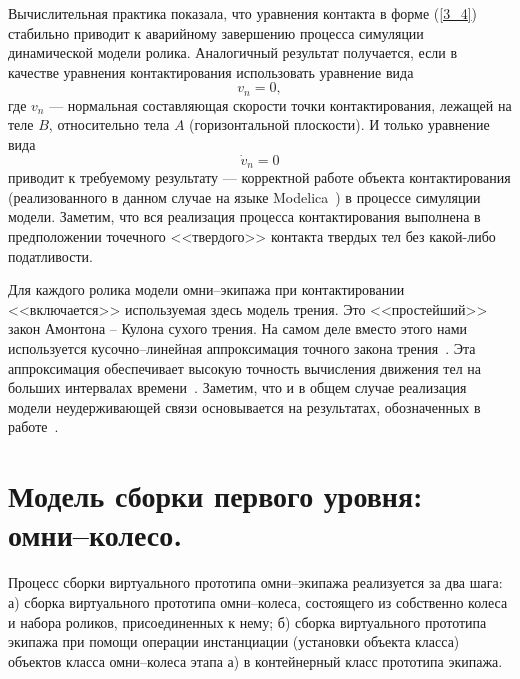 Вычислительная практика показала, что уравнения контакта в форме (\ref{3_4})
стабильно приводит к аварийному завершению процесса симуляции динамической 
модели ролика. Аналогичный результат получается, если в качестве уравнения 
контактирования использовать уравнение вида 
$$
v_n=0,
$$
где $v_n$ --- нормальная составляющая скорости точки контактирования, лежащей
на теле $B$, относительно тела $A$ (горизонтальной плоскости). И только 
уравнение вида
$$
\dot{v}_n=0
$$
приводит к требуемому результату --- корректной работе объекта контактирования
(реализованного в данном случае на языке Modelica~\cite{Fritzson}) в процессе 
симуляции модели. Заметим, что вся реализация процесса контактирования 
выполнена в предположении точечного <<твердого>> контакта твердых тел без 
какой-либо податливости.

Для каждого ролика модели омни--экипажа при контактировании <<включается>>
используемая здесь модель трения. Это <<простейший>> закон Амонтона -- Кулона
сухого трения. На самом деле вместо этого нами используется кусочно--линейная 
аппроксимация точного закона трения~\cite{Kosenko2006}. Эта аппроксимация 
обеспечивает высокую точность вычисления движения тел на больших интервалах 
времени~\cite{Novozhilov}. Заметим, что и в общем случае реализация модели 
неудерживающей связи основывается на результатах, обозначенных в 
работе~\cite{Kosenko2006}.

\section{Модель сборки первого уровня: омни--колесо.\ }
\label{sec4}
Процесс сборки виртуального прототипа омни--экипажа реализуется за два шага:
а) сборка виртуального прототипа омни--колеса, состоящего из собственно колеса
и набора роликов, присоединенных к нему; б) сборка виртуального прототипа
экипажа при помощи операции инстанциации (установки объекта класса) объектов 
класса омни--колеса этапа а) в контейнерный класс прототипа экипажа.

